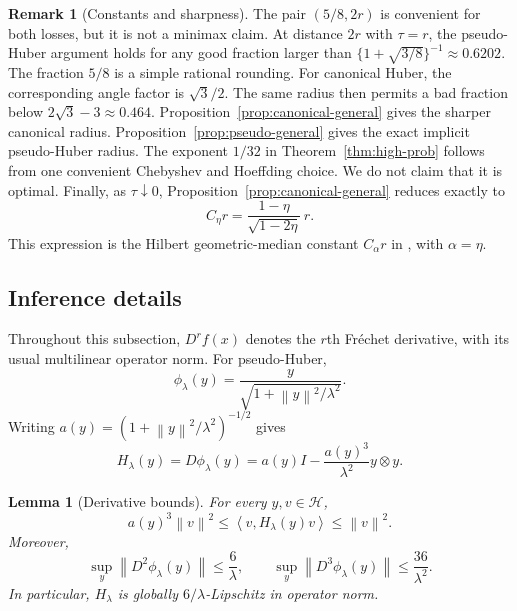 \documentclass[twoside]{article}
\newtheorem{lemma}[theorem]{Lemma}
\theoremstyle{definition}
\newtheorem{remark}[theorem]{Remark}
\newcommand{\Hcal}{\mathcal H}
\newcommand{\norm}[1]{\left\lVert #1\right\rVert}
\newcommand{\ip}[2]{\left\langle #1,#2\right\rangle}
\begin{document}
\begin{remark}[Constants and sharpness]\label{rem:constants}
The pair $(5/8,2r)$ is convenient for both losses, but it is not a minimax claim. At distance $2r$ with $\tau=r$, the pseudo-Huber argument holds for any good fraction larger than $\{1+\sqrt{3/8}\}^{-1}\approx0.6202$. The fraction $5/8$ is a simple rational rounding. For canonical Huber, the corresponding angle factor is $\sqrt3/2$. The same radius then permits a bad fraction below $2\sqrt3-3\approx0.464$. Proposition~\ref{prop:canonical-general} gives the sharper canonical radius. Proposition~\ref{prop:pseudo-general} gives the exact implicit pseudo-Huber radius. The exponent $1/32$ in Theorem~\ref{thm:high-prob} follows from one convenient Chebyshev and Hoeffding choice. We do not claim that it is optimal. Finally, as $\tau\downarrow0$, Proposition~\ref{prop:canonical-general} reduces exactly to
\[
    C_\eta r=\frac{1-\eta}{\sqrt{1-2\eta}}\,r.
\]
This expression is the Hilbert geometric-median constant $C_\alpha r$ in \citet[Lemma~2.1(a)]{minsker_2015_GeometricMedianRobust}, with $\alpha=\eta$.
\end{remark}

\subsection{Inference details}\label{app:inference}

Throughout this subsection, $D^r f(x)$ denotes the $r$th Fr\'echet derivative, with its usual multilinear operator norm. For pseudo-Huber,
\[
    \phi_\lambda(y)=\frac{y}{\sqrt{1+\norm y^2/\lambda^2}}.
\]
Writing $a(y)=(1+\norm y^2/\lambda^2)^{-1/2}$ gives
\begin{equation}\label{eq:pseudo-hessian}
    H_\lambda(y)=D\phi_\lambda(y)
    =a(y)I-\frac{a(y)^3}{\lambda^2}y\otimes y.
\end{equation}

\begin{lemma}[Derivative bounds]\label{lem:derivative-bounds}
For every $y,v\in\Hcal$,
\begin{equation}\label{eq:hessian-bounds}
    a(y)^3\norm v^2
    \le\ip{v}{H_\lambda(y)v}
    \le\norm v^2.
\end{equation}
Moreover,
\[
    \sup_y\norm{D^2\phi_\lambda(y)}\le\frac6\lambda,
    \qquad
    \sup_y\norm{D^3\phi_\lambda(y)}\le\frac{36}{\lambda^2}.
\]
In particular, $H_\lambda$ is globally $6/\lambda$-Lipschitz in operator norm.
\end{lemma}
\end{document}
